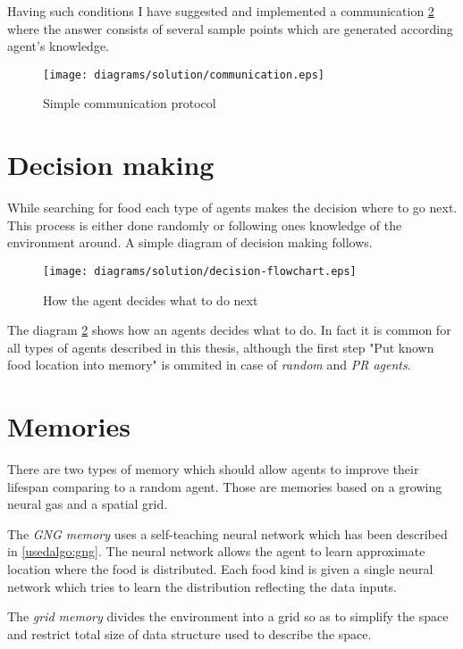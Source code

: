 Having such conditions I have suggested and implemented a communication \ref{solution:decision} where the answer consists of several sample points which are generated according agent's knowledge.

\begin{figure}
  \centering                                
  \texttt{[image: diagrams/solution/communication.eps]}    
  \caption{Simple communication protocol}
  \label{solution:communication}
\end{figure}

\section{Decision making}

While searching for food each type of agents makes the decision where to go next. This process is either done randomly or following ones knowledge of the environment around. A simple diagram of decision making follows.

\begin{figure}
  \centering                                
  \texttt{[image: diagrams/solution/decision-flowchart.eps]}    
  \caption{How the agent decides what to do next}
  \label{solution:decision}
\end{figure}

The diagram \ref{solution:decision} shows how an agents decides what to do. In fact it is common for all types of agents described in this thesis, although the first step "Put known food location into memory" is ommited in case of \emph{random} and \emph{PR agents}.

\section{Memories}

There are two types of memory which should allow agents to improve their lifespan comparing to a random agent. Those are memories based on a growing neural gas and a spatial grid.       

The \emph{GNG memory} uses a self-teaching neural network which has been described in \ref{usedalgo:gng}. The neural network allows the agent to learn approximate location where the food is distributed. Each food kind is given a single neural network which tries to learn the distribution reflecting the data inputs.

The \emph{grid memory} divides the environment into a grid so as to simplify the space and restrict total size of data structure used to describe the space. 




